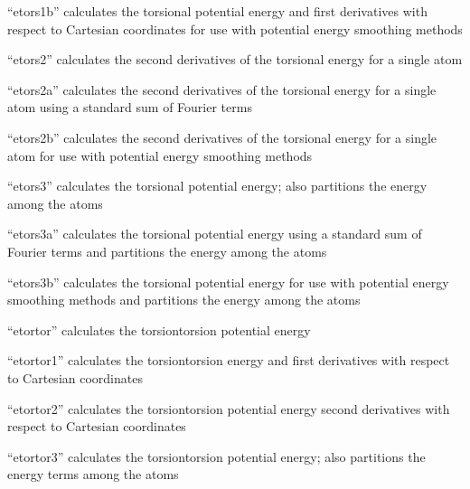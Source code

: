 \documentclass[letterpaper,11pt,english]{sphinxmanual}
\begin{document}
“etors1b” calculates the torsional potential energy and first derivatives with respect to Cartesian coordinates for use with potential energy smoothing methods


“etors2” calculates the second derivatives of the torsional energy for a single atom


“etors2a” calculates the second derivatives of the torsional energy for a single atom using a standard sum of Fourier terms


“etors2b” calculates the second derivatives of the torsional energy for a single atom for use with potential energy smoothing methods


“etors3” calculates the torsional potential energy; also partitions the energy among the atoms


“etors3a” calculates the torsional potential energy using a standard sum of Fourier terms and partitions the energy among the atoms


“etors3b” calculates the torsional potential energy for use with potential energy smoothing methods and partitions the energy among the atoms


“etortor” calculates the torsion\sphinxhyphen{}torsion potential energy


“etortor1” calculates the torsion\sphinxhyphen{}torsion energy and first derivatives with respect to Cartesian coordinates


“etortor2” calculates the torsion\sphinxhyphen{}torsion potential energy second derivatives with respect to Cartesian coordinates


“etortor3” calculates the torsion\sphinxhyphen{}torsion potential energy; also partitions the energy terms among the atoms

\end{document}
